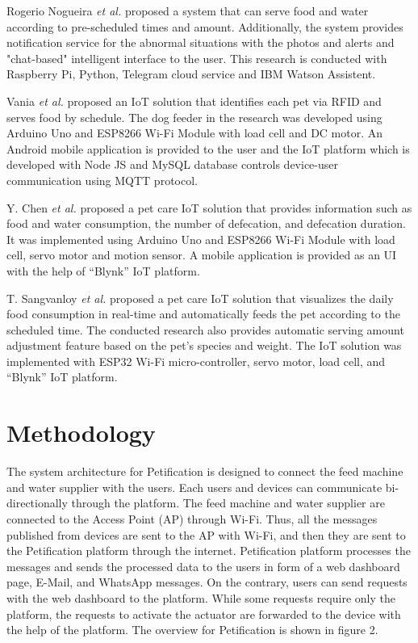 \documentclass[conference]{IEEEtran}
\begin{document}
Rogerio Nogueira \textit{et al.} \cite{b11} proposed a system that can serve food and water according to pre-scheduled times and amount. Additionally, the system provides notification service for the abnormal situations with the photos and alerts and "chat-based" intelligent interface to the user. This research is conducted with Raspberry Pi, Python, Telegram cloud service and IBM Watson Assistent.

Vania \textit{et al.} \cite{b12} proposed an IoT solution that identifies each pet via RFID and serves food by schedule. The dog feeder in the research was developed using Arduino Uno and ESP8266 Wi-Fi Module with load cell and DC motor. An Android mobile application is provided to the user and the IoT platform which is developed with Node JS and MySQL database controls device-user communication using MQTT protocol.

Y. Chen \textit{et al.} \cite{b5} proposed a pet care IoT solution that provides information such as food and water consumption, the number of defecation, and defecation duration. It was implemented using Arduino Uno and ESP8266 Wi-Fi Module with load cell, servo motor and motion sensor. A mobile application is provided as an UI with the help of “Blynk” IoT platform.

T. Sangvanloy \textit{et al.} \cite{b4} proposed a pet care IoT solution that visualizes the daily food consumption in real-time and automatically feeds the pet according to the scheduled time. The conducted research also provides automatic serving amount adjustment feature based on the pet's species and weight. The IoT solution was implemented with ESP32 Wi-Fi micro-controller, servo motor, load cell, and “Blynk” IoT platform.

\section{Methodology}
The system architecture for Petification is designed to connect the feed machine and water supplier with the users. Each users and devices can communicate bi-directionally through the platform. The feed machine and water supplier are connected to the Access Point (AP) through Wi-Fi. Thus, all the messages published from devices are sent to the AP with Wi-Fi, and then they are sent to the Petification platform through the internet. Petification platform processes the messages and sends the processed data to the users in form of a web dashboard page, E-Mail, and WhatsApp messages. On the contrary, users can send requests with the web dashboard to the platform. While some requests require only the platform, the requests to activate the actuator are forwarded to the device with the help of the platform. The overview for Petification is shown in figure 2.
\end{document}
